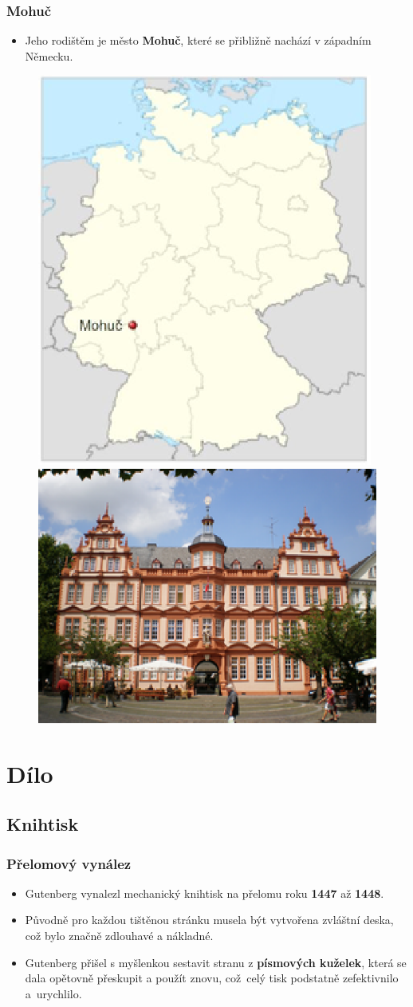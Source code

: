 \documentclass[brown]{beamer}
\begin{document}
\begin{frame}

  \frametitle{Mohuč}

  \begin{itemize}
  \item Jeho rodištěm je město \textbf{Mohuč}, které se přibližně nachází v západním Německu.
  \end{itemize}

  \begin{figure}
	\includegraphics[height = 4.1 cm]{mohuc.eps}
	\quad
  	\includegraphics[height = 4 cm]{museum.eps}
  \end{figure}

  \end{frame}

\section{Dílo}

\subsection{Knihtisk}

\begin{frame}

  \frametitle{Přelomový vynález}
  
  \begin{itemize}
  
  \item Gutenberg vynalezl mechanický knihtisk na přelomu roku \textbf{1447} až \textbf{1448}.
  \item Původně pro každou tištěnou stránku musela být vytvořena zvláštní deska, což bylo značně zdlouhavé a nákladné.
  \item Gutenberg přišel s myšlenkou sestavit stranu z \textbf{písmových kuželek}, která se dala opětovně přeskupit a použít znovu, což~celý tisk podstatně zefektivnilo a~urychlilo.
  
  \end{itemize}
\end{frame}
\end{document}
